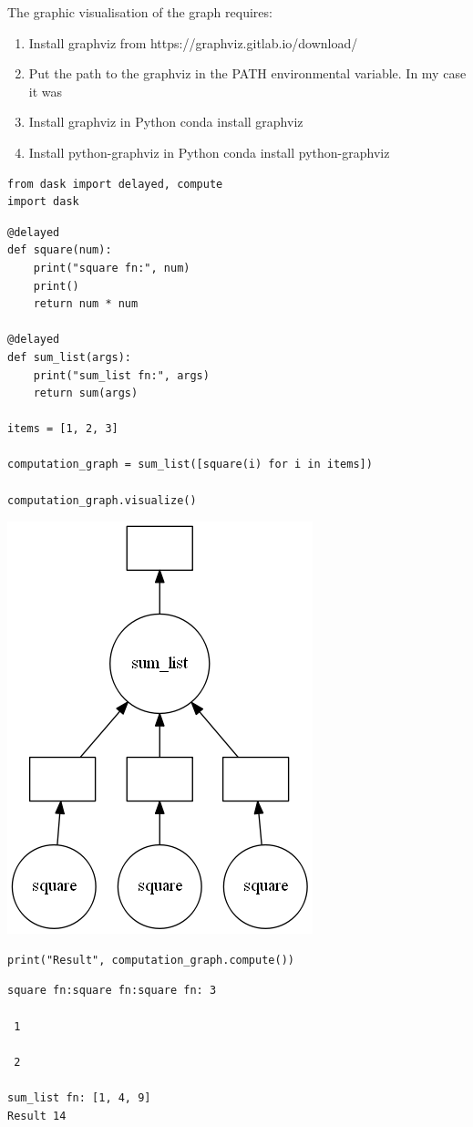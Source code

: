 The graphic visualisation of the graph requires:
\begin{enumerate}
\item Install graphviz from https://graphviz.gitlab.io/download/
\item Put the path to the graphviz in the PATH environmental variable. In my case it was\\
\item Install graphviz in Python
        conda install graphviz
\item Install python-graphviz  in Python
        conda install python-graphviz
\end{enumerate}

\begin{lstlisting}[style=incellstyle]
from dask import delayed, compute
import dask
\end{lstlisting}

\begin{lstlisting}[style=incellstyle]
@delayed
def square(num):
    print("square fn:", num)
    print()
    return num * num

@delayed
def sum_list(args):
    print("sum_list fn:", args)
    return sum(args)

items = [1, 2, 3]

computation_graph = sum_list([square(i) for i in items])

computation_graph.visualize()
\end{lstlisting}

\begin{center}
\includegraphics[width=.3\textwidth]{pic/daskgrahpdemo}
\end{center}

\begin{lstlisting}[style=incellstyle]
print("Result", computation_graph.compute())
\end{lstlisting}


\begin{lstlisting}[style=outcellstyle]
square fn:square fn:square fn: 3

 1

 2

sum_list fn: [1, 4, 9]
Result 14

\end{lstlisting} 